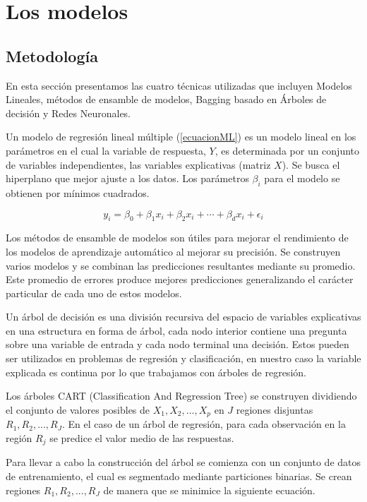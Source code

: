 \documentclass[a4paper,12pt,twocolumn]{article}
\begin{document}
\section{Los modelos}


\subsection{Metodología}

En esta sección presentamos las cuatro técnicas utilizadas que incluyen Modelos Lineales, métodos de ensamble de modelos, Bagging basado en Árboles de decisión y Redes Neuronales.

Un modelo de regresión lineal múltiple (\ref{ecuacionML}) es un modelo lineal en los parámetros en el cual la variable de respuesta, $Y$, es determinada por un conjunto de variables independientes, las variables explicativas (matriz $X$). Se busca el hiperplano que mejor ajuste a los datos. Los parámetros $\beta_i$ para el modelo se obtienen por mínimos cuadrados.

\begin{equation}
y_{i}=\beta_{0}+\beta_{1} x_{i}+\beta_{2} x_{i}+\cdots+\beta_{d} x_{i}+\epsilon_{i}
\label{ecuacionML}
\end{equation}

Los métodos de ensamble de modelos son útiles para mejorar el rendimiento de los modelos de aprendizaje automático al mejorar su precisión. Se construyen varios modelos y se combinan las predicciones resultantes mediante su promedio. Este promedio de errores produce mejores predicciones generalizando el carácter particular de cada uno de estos modelos.

Un árbol de decisión es una división recursiva del espacio de variables explicativas en una estructura en forma de árbol, cada nodo interior contiene una pregunta sobre una variable de entrada y cada nodo terminal una decisión. Estos pueden ser utilizados en problemas de regresión y clasificación, en nuestro caso la variable explicada es continua por lo que trabajamos con árboles de regresión.  

Los árboles CART (Classification And Regression Tree) se construyen dividiendo el conjunto de valores posibles de $X_1,X_2,...,X_p$ en $J$ regiones disjuntas $R_1, R_2,..., R_J$. En el caso de un árbol de regresión, para cada observación en la región $R_j$ se predice el valor medio de las respuestas.

Para llevar a cabo la construcción del árbol se comienza con un conjunto de datos de entrenamiento, el cual es segmentado mediante particiones binarias. Se crean regiones $R_1, R_2,..., R_J$ de manera que se minimice la siguiente ecuación.
\end{document}
